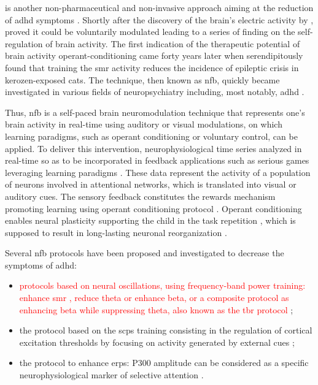  is another non-pharmaceutical and non-invasive approach aiming at the reduction of \gls{adhd} symptoms 
\citep{Arns2015, Steffert2010, Marzbani2016}. Shortly after the discovery of the brain's electric activity by 
\citet{Berger1929}, \citet{Durup1935} proved it could be voluntarily modulated leading to a series of finding on the 
self-regulation of brain activity. The first indication of the therapeutic potential of brain activity operant-conditioning 
came forty years later when \citet{Sterman1974} serendipitously found that training the \gls{smr} activity reduces the incidence 
of epileptic crisis in kerozen-exposed cats. The technique, then known as \gls{nfb}, quickly became investigated in various 
fields of neuropsychiatry including, most notably, \gls{adhd} \citep{Lubar1976, Rossiter1995, Linden1996, Maurizio2014}.

Thus, \gls{nfb} is a self-paced brain neuromodulation technique that represents one's brain activity in real-time using auditory 
or visual modulations, on which learning paradigms, such as operant conditioning
\citep{Reynolds1975} or voluntary control, can be applied. To deliver this intervention, neurophysiological time series 
analyzed in real-time so as to be incorporated in feedback applications such as serious games leveraging learning paradigms \citep{Wang2010}. 
These data represent the activity of a population of neurons involved in attentional networks, which is translated into 
visual or auditory cues. The sensory feedback constitutes the rewards mechanism promoting learning using operant conditioning 
protocol \citep{Sherlin2011}. Operant conditioning enables neural plasticity supporting the child in the task repetition \citep{Skinner1961}, 
which is supposed to result in long-lasting neuronal reorganization \citep{VanDoren2017}. 

Several \gls{nfb} protocols have been proposed and investigated to decrease the symptoms of \gls{adhd}:
\begin{itemize} 
  \item \textcolor{red}{protocols based on neural oscillations, using frequency-band power training: enhance \gls{smr} \citep{Beauregard2006}, reduce theta 
	  or enhance beta, or a composite protocol as enhancing beta while suppressing theta, also known as the \gls{tbr}
    protocol} \citep{Lubar1976, Arns2013}; 
  \item the protocol based on the \glspl{scp} training consisting in the regulation of
    cortical excitation thresholds by focusing on activity generated by external cues 
    \citep{Heinrich2004, Banaschewski2007}; 
  \item the protocol to enhance \glspl{erp}: P300 amplitude can be considered as a specific
    neurophysiological marker of selective attention \citep{Fouillen2017}.  
\end{itemize} 

